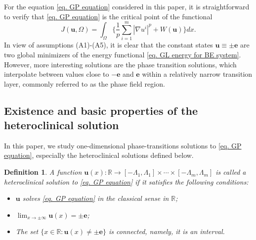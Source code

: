 \documentclass[11pt,twoside,reqno]{amsart}
\newcounter{assu}
\newtheorem{definition}{Definition}[section]
\numberwithin{equation}{section}
\begin{document}
For the equation \eqref{eq. GP equation} considered in this paper, it is straightforward to verify that \eqref{eq. GP equation} is the critical point of the functional
\begin{equation}\label{eq. GL energy for BE system}
    J(\mathbf{u},\Omega)=\int_{\Omega}\Big\{\frac{1}{p}\sum_{i=1}^{m}|\nabla u^{i}|^{p}+W(\mathbf{u})\Big\}dx.
\end{equation}
In view of assumptions (A1)-(A5), it is clear that the constant states $\mathbf{u}\equiv\pm\mathbf{e}$ are two global minimizers of the energy functional  \eqref{eq. GL energy for BE system}. However, more interesting solutions are the phase transition solutions, which interpolate between values close to $-\mathbf{e}$ and $\mathbf{e}$ within a relatively narrow transition layer, commonly referred to as the phase field region.

\subsection{Existence and basic properties of the heteroclinical solution}
In this paper, we study one-dimensional phase-transitions solutions to \eqref{eq. GP equation}, especially the heteroclinical solutions defined below.

\begin{definition}\label{def. heteroclinical} A function
    $\mathbf{u}(x):\mathbb{R}\to[-\Lambda_{1},\Lambda_{1}]\times\cdots\times[-\Lambda_{m},\Lambda_{m}]$ 
       is called a heteroclinical solution to \eqref{eq. GP equation} if it satisfies the following conditions:
    \begin{itemize}
        \item[(1)]  $\mathbf{u}$ solves \eqref{eq. GP equation} in the classical sense in $\mathbb{R}$;
        \item[(2)] $\displaystyle\lim_{x\to\pm\infty}\mathbf{u}(x)=\pm\mathbf{e}$;
        \item[(3)] The set $\{x\in\mathbb{R}:\mathbf{u}(x)\neq\pm\mathbf{e}\}$ is connected,  namely, it is an interval.
    \end{itemize}
\end{definition}
\end{document}
